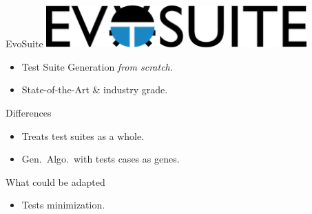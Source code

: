 \documentclass{beamer}
\begin{document}
\appendix

\begin{frame}[standout]

\end{frame}

\begin{frame}{EvoSuite}
  \includegraphics[width=0.75\textwidth]{evosuite-logo}
  \begin{itemize}
    \item Test Suite Generation \emph{from scratch}.
    \item State-of-the-Art \& industry grade.
  \end{itemize}

  \vfill

  \begin{block}{Differences}
    \begin{itemize}
      \item Treats test suites as a whole.
      \item Gen.\ Algo.\ with tests cases as genes.
    \end{itemize}
  \end{block}

  \begin{block}{What could be adapted}
    \begin{itemize}
      \item Tests minimization.
    \end{itemize}
  \end{block}
\end{frame}
\end{document}
